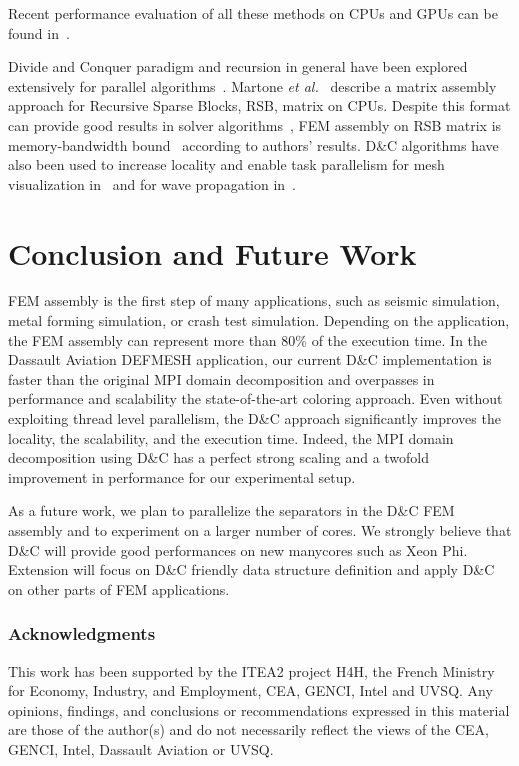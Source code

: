 \documentclass[10pt]{IOS-Book-Article}
\begin{document}
Recent performance evaluation of all these methods on CPUs and GPUs can be found in~\cite{cecka2011assembly,CPUGPUasm}.

Divide and Conquer paradigm and recursion in general have been explored extensively for parallel algorithms~\cite{div}.
Martone \textit{et al.}~\cite{RSBasm} describe a matrix assembly approach for Recursive Sparse Blocks, RSB, matrix on CPUs.
Despite this format can provide good results in solver algorithms~\cite{RSBsolver}, FEM assembly on RSB matrix is memory-bandwidth bound~\cite{RSBasm} according to authors' results.
D\&C algorithms have also been used to increase locality and enable task parallelism for mesh
visualization in~\cite{tvcg10,egpgv10,hppc10} and for wave propagation in~\cite{dc_specfem}.



\section{Conclusion and Future Work}
\label{sec:conc}
FEM assembly is the first step of many applications, such as seismic simulation, metal forming simulation, or crash test simulation.
Depending on the application, the FEM assembly can represent more than 80\% of the execution time.
In the Dassault Aviation DEFMESH application, our current D\&C implementation is faster than the original MPI domain decomposition and overpasses in performance and scalability the state-of-the-art coloring approach.
Even without exploiting thread level parallelism, the D\&C approach significantly improves the locality, the scalability, and the execution time.
Indeed, the MPI domain decomposition using D\&C has a perfect strong scaling and a twofold improvement in performance for our experimental setup.

As a future work, we plan to parallelize the separators in the D\&C FEM assembly and to experiment on a larger number of cores.
We strongly believe that D\&C will provide good performances on new manycores such as Xeon Phi.
Extension will focus on D\&C friendly data structure definition and apply D\&C on other parts of FEM applications. 

\subsubsection*{Acknowledgments} \scriptsize{
This work has been supported by the ITEA2 project H4H, the French Ministry for Economy,
Industry, and Employment, CEA, GENCI, Intel and UVSQ.  Any opinions,
findings, and conclusions or recommendations expressed in this
material are those of the author(s) and do not necessarily reflect the
views of the CEA, GENCI, Intel, Dassault Aviation or UVSQ.}



\end{document}
